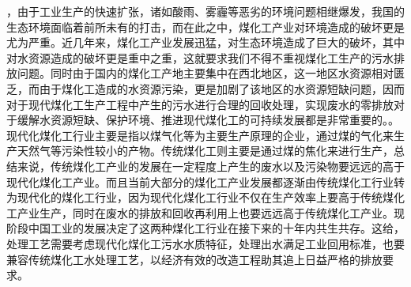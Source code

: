 \par
{}，由于工业生产的快速扩张，诸如酸雨、雾霾等恶劣的环境问题相继爆发，我国的生态环境面临着前所未有的打击，而在此之中，煤化工产业对环境造成的破坏更是尤为严重。近几年来，煤化工产业发展迅猛，对生态环境造成了巨大的破坏，其中对水资源造成的破坏更是重中之重，这就要求我们不得不重视煤化工生产的污水排放问题。同时由于国内的煤化工产地主要集中在西北地区，这一地区水资源相对匮乏，而由于煤化工造成的水资源污染，更是加剧了该地区的水资源短缺问题，因而对于现代煤化工生产工程中产生的污水进行合理的回收处理，实现废水的零排放对于缓解水资源短缺、保护环境、推进现代煤化工的可持续发展都是非常重要的。。现代化煤化工行业主要是指以煤气化等为主要生产原理的企业，通过煤的气化来生产天然气等污染性较小的产物。传统煤化工则主要是通过煤的焦化来进行生产，总结来说，传统煤化工产业的发展在一定程度上产生的废水以及污染物要远远的高于现代化煤化工产业。而且当前大部分的煤化工产业发展都逐渐由传统煤化工行业转为现代化的煤化工行业，因为现代化煤化工行业不仅在生产效率上要高于传统煤化工产业生产，同时在废水的排放和回收再利用上也要远远高于传统煤化工产业。现阶段中国工业的发展决定了这两种煤化工行业在接下来的十年内共生共存。这给，处理工艺需要考虑现代化煤化工污水水质特征，处理出水满足工业回用标准，也要兼容传统煤化工水处理工艺，以经济有效的改造工程助其追上日益严格的排放要求。
